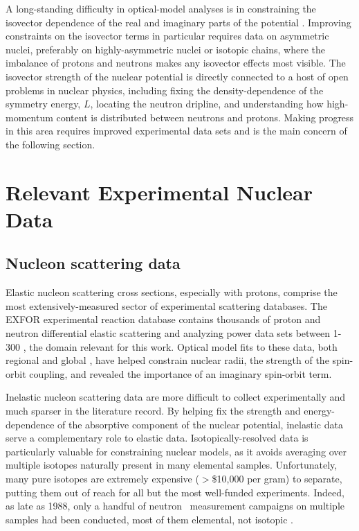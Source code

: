 A long-standing difficulty in optical-model analyses is in constraining the isovector dependence
of the real and imaginary parts of the potential \cite{Holt16, Anderson1990}. Improving constraints on the
isovector terms in particular requires data
on asymmetric nuclei, preferably on highly-asymmetric nuclei or isotopic chains,
where the imbalance of protons and neutrons makes any isovector effects most visible. The isovector
strength of the nuclear potential is directly connected to a host of open problems in nuclear physics,
including fixing the density-dependence of the symmetry energy, $L$, locating the
neutron dripline, and understanding how high-momentum content is distributed between neutrons and
protons. Making progress in this area requires improved experimental data sets
and is the main concern of the following section.

\section{Relevant Experimental Nuclear Data}

\subsection{Nucleon scattering data}
Elastic nucleon scattering cross sections, especially with protons, comprise the most extensively-measured
sector of experimental scattering databases. The EXFOR experimental reaction database
\cite{EXFORDatabase} contains thousands of proton and neutron
differential elastic scattering and analyzing
power data sets between 1-300 \mega\electronvolt, the domain relevant for this work. Optical model fits
to these data, both regional and global \cite{CH89, KoningDelaroche}, have helped
constrain nuclear radii, the strength of the spin-orbit coupling,
and revealed the importance of an imaginary spin-orbit term.

Inelastic nucleon scattering data are more difficult to collect experimentally and much sparser in
the literature record. By helping fix the strength and energy-dependence of the absorptive component
of the nuclear potential, inelastic data serve a complementary role to elastic
data.
\noindent
Isotopically-resolved data is particularly valuable for constraining nuclear
models, as it avoids averaging over multiple isotopes naturally present in many elemental samples.
Unfortunately, many pure isotopes are extremely expensive ($>$\$10,000 per gram) to
separate, putting them out of reach for all but the most well-funded experiments.
Indeed, as late as 1988, only a handful of neutron \tot\ measurement campaigns
on multiple samples had been conducted, most of them elemental, not isotopic
\cite{BarnBook1988}.

